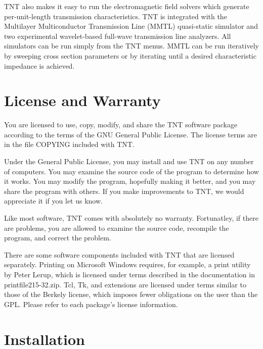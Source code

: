 \documentclass{article}
\begin{document}
TNT also makes it easy to run the electromagnetic field solvers which
generate per-unit-length transmission characteristics.  TNT is
integrated with the Multilayer Multiconductor Transmission Line (MMTL)
quasi-static simulator and two experimental wavelet-based full-wave
transmission line analyzers.  All simulators can be run simply from
the TNT menus.  MMTL can be run iteratively by sweeping cross section
parameters or by iterating until a desired characteristic impedance is
achieved.



\section {License and Warranty}

You are licensed to use, copy, modify, and share the TNT software
package according to the terms of the GNU General Public License.  The
license terms are in the file COPYING included with TNT.

Under the General Public License, you may install and use TNT on any
number of computers.  You may examine the source code of the program
to determine how it works.  You may modify the program, hopefully
making it better, and you may share the program with others.  If you
make improvements to TNT, we would appreciate it if you let us know.

Like most software, TNT comes with absolutely no warranty.
Fortunatley, if there are problems, you are allowed to examine the
source code, recompile the program, and correct the problem.

There are some software components included with TNT that are licensed
separately.  Printing on Microsoft Windows requires, for example, a
print utility by Peter Lerup, which is licensed under terms described
in the documentation in printfile215-32.zip.  Tcl, Tk, and extensions
are licensed under terms similar to those of the Berkely license,
which imposes fewer obligations on the user than the GPL.  Please
refer to each package's license information.



\section {Installation}
\end{document}
